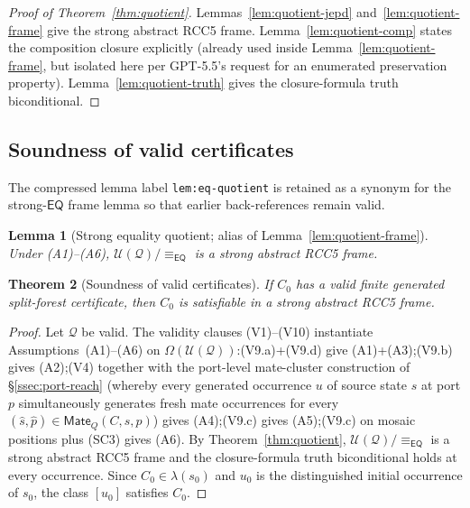 \documentclass[11pt]{article}
\newtheorem{theorem}{Theorem}[section]
\newtheorem{lemma}[theorem]{Lemma}
\newcommand{\EQ}{\mathsf{EQ}}
\newcommand{\Q}{\mathcal Q}
\newcommand{\U}{\mathcal U}
\newcommand{\Mate}{\mathsf{Mate}}
\newcommand{\eqc}{\equiv_{\EQ}}
\begin{document}
\begin{proof}[Proof of Theorem~\ref{thm:quotient}]
Lemmas~\ref{lem:quotient-jepd} and~\ref{lem:quotient-frame} give the
strong abstract RCC5 frame.  Lemma~\ref{lem:quotient-comp} states
the composition closure explicitly (already used inside
Lemma~\ref{lem:quotient-frame}, but isolated here per GPT-5.5's
request for an enumerated preservation property).
Lemma~\ref{lem:quotient-truth} gives the closure-formula truth
biconditional.
\end{proof}

\subsection{Soundness of valid certificates}
\label{ssec:soundness-corollary}

The compressed lemma label \texttt{lem:eq-quotient} is retained as a
synonym for the strong-$\EQ$ frame lemma so that earlier
back-references remain valid.

\begin{lemma}[Strong equality quotient; alias of Lemma~\ref{lem:quotient-frame}]\label{lem:eq-quotient}
Under (A1)--(A6), $\U(\Q)/\eqc$ is a strong abstract RCC5 frame.
\end{lemma}

\begin{theorem}[Soundness of valid certificates]\label{thm:soundness}
If $C_0$ has a valid finite generated split-forest certificate, then
$C_0$ is satisfiable in a strong abstract RCC5 frame.
\end{theorem}

\begin{proof}
Let $\Q$ be valid.  The validity clauses (V1)--(V10) instantiate
Assumptions~(A1)--(A6) on $\Omega(\U(\Q))$:\@ (V9.a)+(V9.d) give
(A1)+(A3);\@ (V9.b) gives (A2);\@ (V4) together with the port-level
mate-cluster construction of \S\ref{ssec:port-reach} (whereby every
generated occurrence $u$ of source state $s$ at port $p$
simultaneously generates fresh mate occurrences for every
$(\widehat s,\widehat p)\in\Mate_Q(C,s,p)$) gives (A4);\@ (V9.c)
gives (A5);\@ (V9.c) on mosaic positions plus (SC3) gives (A6).
By Theorem~\ref{thm:quotient}, $\U(\Q)/\eqc$ is a strong abstract
RCC5 frame and the closure-formula truth biconditional holds at every
occurrence.  Since $C_0\in\lambda(s_0)$ and $u_0$ is the distinguished
initial occurrence of $s_0$, the class $[u_0]$ satisfies $C_0$.
\end{proof}
\end{document}
